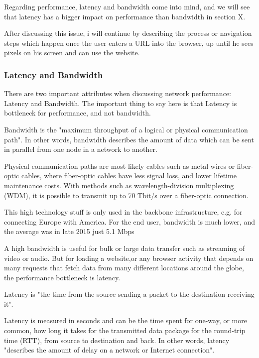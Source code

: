 Regarding performance, latency and bandwidth come into mind, and we will see that latency has a bigger impact on performance than bandwidth in section X.

After discussing this issue, i will continue by describing the process or navigation steps which happen once the user enters a URL into the browser, up until he sees pixels on his screen and can use the website.




\subsubsection{Latency and Bandwidth}

There are two important attributes when discussing network performance: Latency and Bandwidth.
The important thing to say here is that Latency is bottleneck for performance, and not bandwidth.



Bandwidth is the "maximum throughput of a logical or physical communication path". %
In other words, bandwidth describes the amount of data which can be sent in parallel from one node in a network to another. 

Physical communication paths are most likely cables such as metal wires or fiber-optic cables, where fiber-optic cables have less signal loss, and lower lifetime maintenance costs.
With methods such as wavelength-division multiplexing (WDM), it is possible to transmit up to 70 Tbit/s over a fiber-optic connection.  %

This high technology stuff is only used in the backbone infrastructure, e.g. for connecting Europe with America.
For the end user, bandwidth is much lower, and the average was in late 2015 just 5.1 Mbps %

A high bandwidth is useful for bulk or large data transfer such as streaming of video or audio.
But for loading a website,or any browser activity that depends on many requests that fetch data from many different locations around the globe, the performance bottleneck is latency. %



Latency is "the time from the source sending a packet to the destination receiving it".  %

Latency is measured in seconds and can be the time spent for one-way, or more common, how long it takes for the transmitted data package for the round-trip time (RTT), from source to destination and back.
In other words, latency "describes the amount of delay on a network or Internet connection". %


